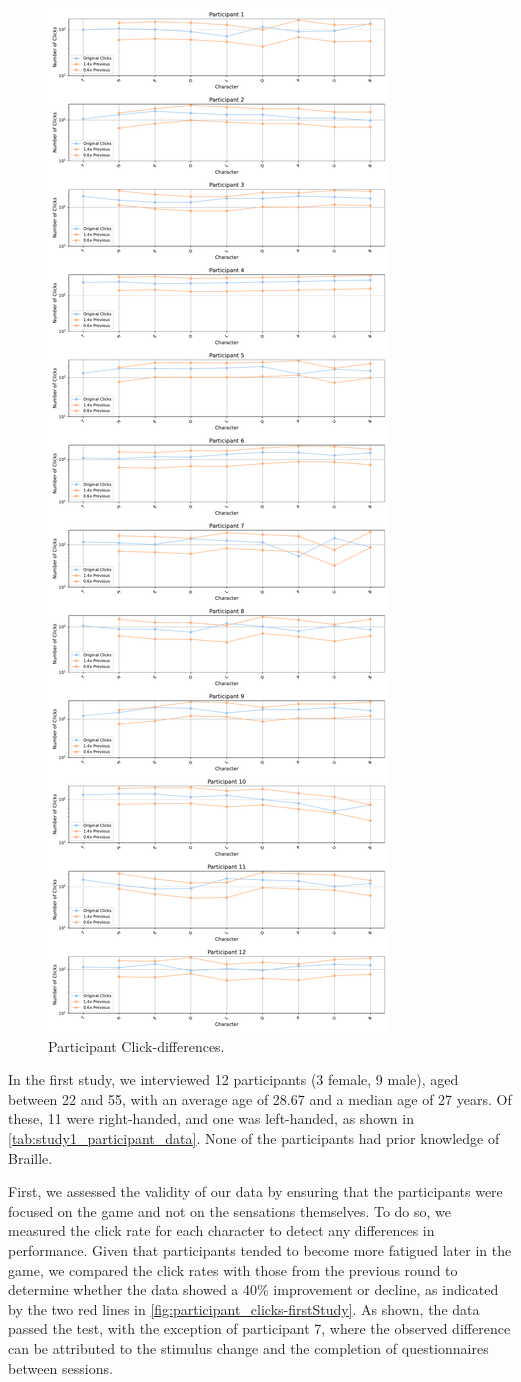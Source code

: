 \begin{figure}
    \centering
    \includegraphics[width=0.5\linewidth]{src/pictures/Study1Data_questionnaire/participantPlots_study1.pdf}
    \caption{Participant Click-differences.}
    \label{fig:participant_clicks-firstStudy}
\end{figure}

In the first study, we interviewed 12 participants (3 female, 9 male), aged between 22 and 55, with an average age of 28.67 and a median age of 27 years. Of these, 11 were right-handed, and one was left-handed, as shown in \autoref{tab:study1_participant_data}. None of the participants had prior knowledge of Braille.

First, we assessed the validity of our data by ensuring that the participants were focused on the game and not on the sensations themselves. To do so, we measured the click rate for each character to detect any differences in performance. Given that participants tended to become more fatigued later in the game, we compared the click rates with those from the previous round to determine whether the data showed a 40\% improvement or decline, as indicated by the two red lines in \autoref{fig:participant_clicks-firstStudy}. As shown, the data passed the test, with the exception of participant 7, where the observed difference can be attributed to the stimulus change and the completion of questionnaires between sessions.


